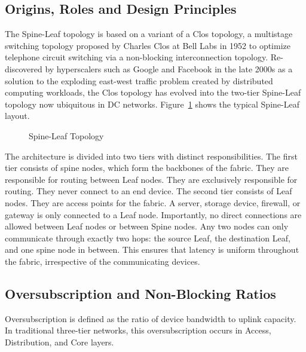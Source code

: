 \subsection*{Origins, Roles and Design Principles}
The Spine-Leaf topology is based on a variant of a Clos topology, a multistage switching topology proposed by Charles Clos at Bell Labs in 1952 to optimize telephone circuit switching via a non-blocking interconnection topology\cite{A_Study_of_Non-Blocking_Switching_Networks}. Re-discovered by hyperscalers such as Google and Facebook in the late 2000s as a solution to the exploding east-west traffic problem created by distributed computing workloads, the Clos topology has evolved into the two-tier Spine-Leaf topology now ubiquitous in DC networks\cite{Introducing_Data_Center_Fabric}. Figure~\ref{fig:spine-leaf} shows the typical Spine-Leaf layout.

\begin{figure}[!htbp]
    \centering
    \SpineLeafDiagram
    \caption{Spine-Leaf Topology}
    \label{fig:spine-leaf}
\end{figure}

The architecture is divided into two tiers with distinct responsibilities\cite{Cisco_Massively_Scalable_Data_Center_Network_Fabric_Design_and_Operation_White_Paper}. The first tier consists of spine nodes, which form the backbones of the fabric. They are responsible for routing between Leaf nodes. They are exclusively responsible for routing. They never connect to an end device. The second tier consists of Leaf nodes. They are access points for the fabric. A server, storage device, firewall, or gateway is only connected to a Leaf node. Importantly, no direct connections are allowed between Leaf nodes or between Spine nodes. Any two nodes can only communicate through exactly two hops: the source Leaf, the destination Leaf, and one spine node in between\cite{Cisco_Massively_Scalable_Data_Center_Network_Fabric_Design_and_Operation_White_Paper}. This ensures that latency is uniform throughout the fabric, irrespective of the communicating devices.

\subsection*{Oversubscription and Non-Blocking Ratios}
Oversubscription is defined as the ratio of device bandwidth to uplink capacity\cite{Oversubscription_in_Networking}. In traditional three-tier networks, this oversubscription occurs in Access, Distribution, and Core layers.

